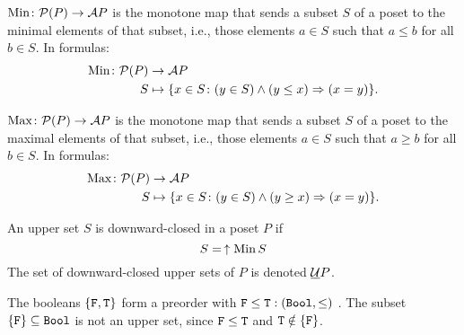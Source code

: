 \begin{definition}
\label{def:Min}
$\operatorname*{Min} \colon \mathcal{P}(P) \to \mathcal{A} P$ is the monotone map that sends a subset $S$ of a poset to the minimal elements of that subset, i.e., those elements $a \in S$ such that $a \leq b$ for all $b \in S$. In formulas:
\begin{equation}
    \begin{aligned}
    \operatorname*{Min} \colon \mathcal{P}(P) &\to \mathcal{A} P\\
    S&\mapsto \{ x\in S\colon (y\in S)\wedge(y\leq x)\Rightarrow (x=y)\}.
    \end{aligned}
\end{equation}
\end{definition}
\begin{definition}
\label{def:Max}
$\operatorname*{Max} \colon \mathcal{P}(P) \to \mathcal{A} P$ is the monotone map that sends a subset $S$ of a poset to the maximal elements of that subset, i.e., those elements $a \in S$ such that $a \geq b$ for all $b \in S$. In formulas:
\begin{equation}
    \begin{aligned}
    \operatorname*{Max} \colon \mathcal{P}(P) &\to \mathcal{A} P\\
    S&\mapsto \{ x\in S\colon (y\in S)\wedge(y\geq x)\Rightarrow (x=y)\}.
    \end{aligned}
\end{equation}
\end{definition}


\begin{definition}
\label{def:downward-closed-upperset}
An upper set $S$ is downward-closed in a poset $P$ if
\begin{equation}
    S =\, \uparrow \operatorname*{Min} S
\end{equation}
The set of downward-closed upper sets of $P$ is denoted $\underline{\mathcal{U}} P$.
\end{definition}

\begin{example}
The booleans $\{\mathtt{F}, \mathtt{T} \}$ form a preorder with $\mathtt{F} \leq \mathtt{T}:(\mathtt{Bool},\leq)$ . The subset $\{\mathtt{F}\} \subseteq \mathtt{Bool}$ is not an upper set, since $\mathtt{F} \leq \mathtt{T}$ and $\mathtt{T} \notin \{\mathtt{F} \}$.	
\end{example}

